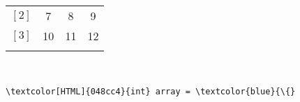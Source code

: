 \begin{itemize}
\begin{itemize}
\begin{minipage}{2.3in}
\begin{tabular}{c | c | c | c|}
				$ \left[2\right] $ & \cellcolor{Arraycolor}7 & \cellcolor{Arraycolor}8 & \cellcolor{Arraycolor}9\\\hhline{~|---}
				$ \left[3\right] $ & \cellcolor{Arraycolor}10 & \cellcolor{Arraycolor}11 & \cellcolor{Arraycolor}12\\\hhline{~|---}
			\end{tabular}\\
			\begin{Verbatim}[commandchars=\\\{\}]
\textcolor[HTML]{048cc4}{int} array = \textcolor{blue}{\{}
			\end{Verbatim}
		\end{minipage}
	\end{itemize}
\end{itemize}
